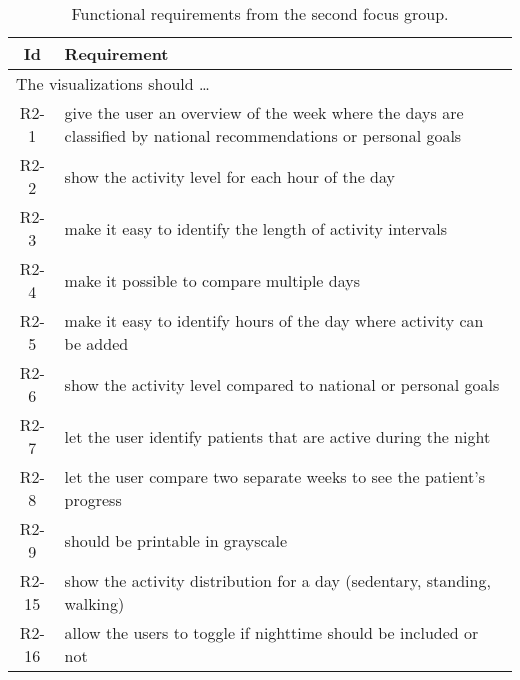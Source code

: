 \begin{table}[h!]
  \begin{center}
  \begin{tabular}{|c|p{12cm}|}
    \hline
      \textbf{Id} & \textbf{Requirement} \\ \hline
    \multicolumn{2}{|l|}{The visualizations should \ldots} \\ \hline
      R2-1 & give the user an overview of the week where the days are classified by national recommendations or personal goals \\ \hline
      R2-2 & show the activity level for each hour of the day \\ \hline
      R2-3 & make it easy to identify the length of activity intervals \\ \hline
      R2-4 & make it possible to compare multiple days \\ \hline
      R2-5 & make it easy to identify hours of the day where activity can be added \\ \hline
      R2-6 & show the activity level compared to national or personal goals \\ \hline
      R2-7 & let the user identify patients that are active during the night \\ \hline
      R2-8 & let the user compare two separate weeks to see the patient's progress \\ \hline
      R2-9 & should be printable in grayscale \\ \hline
      R2-15 & show the activity distribution for a day (sedentary, standing, walking) \\ \hline
      R2-16 & allow the users to toggle if nighttime should be included or not \\ \hline
  \end{tabular}
  \end{center}
  \caption[Final functional requirements]{Functional requirements from the second focus group.}
  \label{tab:f2ReqCon}
\end{table}

